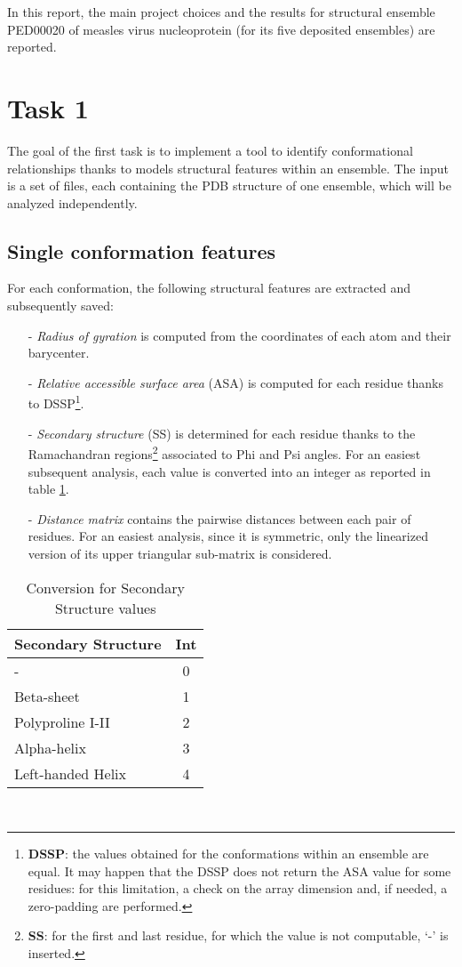 In this report, the main project choices and the results for structural ensemble PED00020 of measles virus nucleoprotein (for its five deposited ensembles) are reported.

\section{Task 1}\label{sec:task1}
\graphicspath{ {./figures/} }
The goal of the first task is to implement a tool to identify conformational relationships thanks to models structural features within an ensemble. The input is a set of files, each containing the PDB structure of one ensemble, which will be analyzed independently.

\subsection{Single conformation features}

For each conformation, the following structural features are extracted and subsequently saved:
\begin{itemize}
\item[-] \emph{Radius of gyration} is computed from the coordinates of each atom and their barycenter.
\item[-] \emph{Relative accessible surface area} (ASA) is computed for each residue thanks to DSSP\footnote{\textbf{DSSP}: the values obtained for the conformations within an ensemble are equal. It may happen that the DSSP does not return the ASA value for some residues: for this limitation, a check on the array dimension and, if needed, a zero-padding are performed. }.
\item[-] \emph{Secondary structure} (SS) is determined for each residue thanks to the Ramachandran regions\footnote{\textbf{SS}: for the first and last residue, for which the value is not computable, `-' is inserted.} associated to Phi and Psi angles. For an easiest subsequent analysis, each value is converted into an integer as reported in table \ref{tab:ss}.
\item[-] \emph{Distance matrix} contains the pairwise distances between each pair of residues. For an easiest analysis, since it is symmetric, only the linearized version of its upper triangular sub-matrix is considered.
\end{itemize}

\begin{table}[H]
\begin{center}
\begin{tabular}{lc}
\textbf{Secondary Structure} & \textbf{Int}\\
\hline
- & 0\\
\hline
Beta-sheet & 1\\
\hline
Polyproline I-II & 2\\
\hline
Alpha-helix & 3\\
\hline
Left-handed Helix & 4\\
\end{tabular}
\end{center}
\caption{Conversion for Secondary Structure values}~\label{tab:ss}
\end{table}


